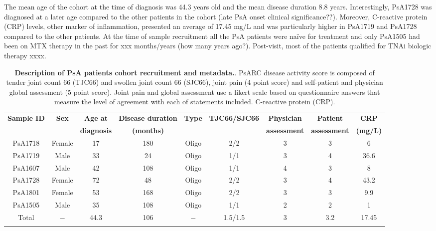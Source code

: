 The mean age of the cohort at the time of diagnosis was 44.3 years old and the mean disease duration 8.8 years. Interestingly, PsA1728 was diagnosed at a later age compared to the other patients in the cohort (late PsA onset clinical significance??). Moreover, C-reactive protein (CRP) levels, other marker of inflammation, presented an average of 17.45 mg/L and was particularly higher in PsA1719 and PsA1728 compared to the other patients. At the time of sample recruitment all the PsA patients were na\"{i}ve for treatment and only PsA1505 had been on MTX therapy in the past for xxx months/years (how many years ago?). Post-visit, most of the patients qualified for TNAi biologic therapy xxxx.


%
\begin{landscape}
\begin{center}
\begin{longtable}[ht]{c c c c c c c c c}
\caption[Description of PsA patients cohort recruitment and metadata.]{\textbf{Description of PsA patients cohort recruitment and metadata.}. PsARC disease activity score is composed of tender joint count 66 (TJC66) and swollen joint count 66 (SJC66), joint pain (4 point score) and self-patient and physician global assessment (5 point score). Joint pain and global assessment use a likert scale based on questionnaire answers that measure the level of agreement with each of statements included. C-reactive protein (CRP).}
\label{tab:PSA_cohort_metadata} \\
\toprule
\textbf{ Sample ID} & \textbf{Sex} & \textbf{Age at} & \textbf{Disease duration} & \textbf{Type} &\textbf{TJC66/SJC66}  & \textbf{Physician } & \textbf{Patient} & \textbf{CRP} \\
                   &               & \textbf{diagnosis} & \textbf{(months)}      &               &                      & \textbf{assessment} & \textbf{assessment}  & \textbf{(mg/L)} \\
\midrule
\midrule
PsA1718 & Female & 17 & 180 & Oligo  & 2/2 & 3 & 3 & 6 \\
PsA1719	& Male &	33 & 24	 & Oligo &	1/1 &	3 & 4 & 36.6 \\           
PsA1607 &	Male & 42 & 108 &	Oligo &	1/1	& 4 & 3 & 8 \\
PsA1728	& Female & 72	& 48 & Oligo & 2/2 & 3 & 4 & 43.2 \\
PsA1801	& Female & 53 & 168 & Oligo & 2/2 &	3 & 3 & 9.9 \\
PsA1505 & Male & 35 &	108 & Oligo & 1/1 & 2 & 2 & 1 \\	
\midrule
Total		& $-$	&	44.3 & 106 & $-$ & 1.5/1.5 & 3 & 3.2 & 17.45 \\																			
\bottomrule
\medskip
\end{longtable}
\end{center}
\end{landscape}

